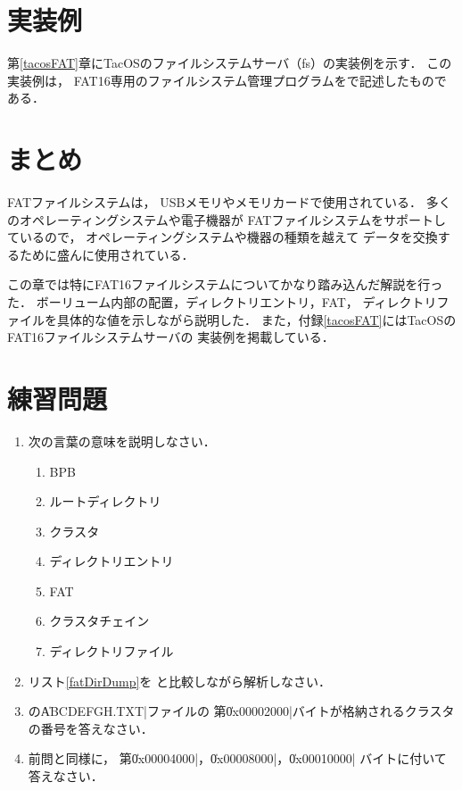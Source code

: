 \section{実装例}
第\ref{tacosFAT}章にTacOSのファイルシステムサーバ（fs）の実装例を示す．
この実装例は，
FAT16専用のファイルシステム管理プログラムを{\cmml}で記述したものである．

\section{まとめ}
FATファイルシステムは，
USBメモリやメモリカードで使用されている．
多くのオペレーティングシステムや電子機器が
FATファイルシステムをサポートしているので，
オペレーティングシステムや機器の種類を越えて
データを交換するために盛んに使用されている．

この章では特にFAT16ファイルシステムについてかなり踏み込んだ解説を行った．
ボーリューム内部の配置，ディレクトリエントリ，FAT，
ディレクトリファイルを具体的な値を示しながら説明した．
また，付録\ref{tacosFAT}にはTacOSのFAT16ファイルシステムサーバの
実装例を掲載している．

\section*{練習問題}
\begin{enumerate}
  \renewcommand{\labelenumi}{\ttfamily\arabic{chapter}.\arabic{enumi}}
  \setlength{\leftskip}{1em}
\item 次の言葉の意味を説明しなさい．
  \begin{enumerate}
  \item BPB
  \item ルートディレクトリ
  \item クラスタ
  \item ディレクトリエントリ
  \item FAT
  \item クラスタチェイン
  \item ディレクトリファイル
  \end{enumerate}
\item リスト\ref{fatDirDump}を
  と比較しながら解析しなさい．
\item {}の\|ABCDEFGH.TXT|ファイルの
  第\|0x00002000|バイトが格納されるクラスタの番号を答えなさい．
\item 前問と同様に，
  第\|0x00004000|，\|0x00008000|，\|0x00010000|
  バイトに付いて答えなさい．
\end{enumerate}
